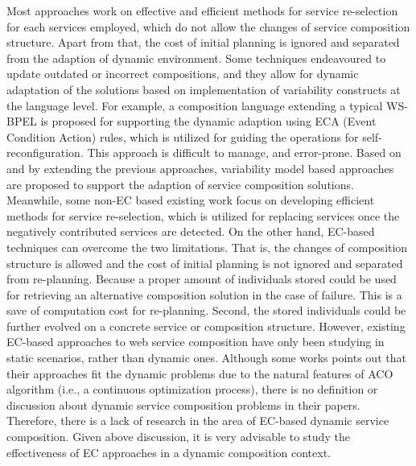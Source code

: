 Most approaches work on effective and efficient methods for service re-selection for each services employed, which do not allow the changes of service composition structure. Apart from that, the cost of initial planning is ignored and separated from the adaption of dynamic environment. Some techniques \cite{andrews2003business,baresi2011self,koning2009vxbpel} endeavoured to update outdated or incorrect compositions, and they allow for dynamic adaptation of the solutions based on implementation of variability constructs at the language level. For example, a composition language extending a typical WS-BPEL \cite{andrews2003business} is proposed for supporting the dynamic adaption using ECA (Event Condition Action) rules, which is utilized for guiding the operations for self-reconfiguration. This approach is difficult to manage, and error-prone. Based on and by extending the previous approaches, variability model based approaches \cite{alferez2014dynamic} are proposed to support the adaption of service composition solutions. Meanwhile, some non-EC based existing work \cite{mohanty2010web,salas2006ws,wagner2016robust,yin2010qos} focus on developing efficient methods for service re-selection, which is utilized for replacing services once the negatively contributed services are detected. On the other hand, EC-based techniques can overcome the two limitations. That is, the changes of composition structure is allowed and the cost of initial planning is not ignored and separated from re-planning. Because a proper amount of individuals stored could be used for retrieving an alternative composition solution in the case of failure. This is a save of computation cost for re-planning. Second, the stored individuals could be further evolved on a concrete service or composition structure. However, existing EC-based approaches to web service composition have only been studying in static scenarios, rather than dynamic ones. Although some works \cite{feng2013dynamic,liu2005dynamic} points out that their approaches fit the dynamic problems due to the natural features of ACO algorithm (i.e., a continuous optimization process), there is no definition or discussion about dynamic service composition problems in their papers. Therefore, there is a lack of research in the area of EC-based dynamic service composition. Given above discussion, it is very advisable to study the effectiveness of EC approaches in a dynamic composition context.


